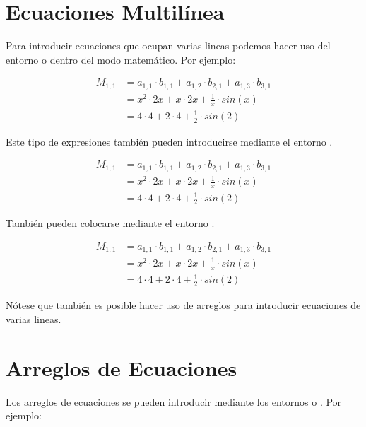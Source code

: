 \documentclass[letterpaper,12pt]{book}
\begin{document}
\pagebreak

\section{Ecuaciones Multilínea}

Para introducir ecuaciones que ocupan varias lineas podemos hacer uso del entorno \verb@aligned@ o 
\verb@split@ dentro del modo matemático. Por ejemplo:

\[
\begin{aligned}
	M_{1,1} &= a_{1,1} \cdot b_{1,1} + a_{1,2} \cdot b_{2,1} + a_{1,3} \cdot b_{3,1} \\
			&= x^2 \cdot 2x + x \cdot 2x + \frac{1}{x} \cdot sin(x) \\
			&= 4 \cdot 4 + 2 \cdot 4 + \frac{1}{2} \cdot sin(2) 
\end{aligned}
\]

Este tipo de expresiones también pueden introducirse mediante el entorno \verb@equation@.

\begin{equation*}
\begin{aligned}
	M_{1,1} &= a_{1,1} \cdot b_{1,1} + a_{1,2} \cdot b_{2,1} + a_{1,3} \cdot b_{3,1} \\
			&= x^2 \cdot 2x + x \cdot 2x + \frac{1}{x} \cdot sin(x) \\
			&= 4 \cdot 4 + 2 \cdot 4 + \frac{1}{2} \cdot sin(2) 
\end{aligned}
\end{equation*}

También pueden colocarse mediante el entorno \verb@align@.

\begin{align*}
	M_{1,1} &= a_{1,1} \cdot b_{1,1} + a_{1,2} \cdot b_{2,1} + a_{1,3} \cdot b_{3,1} \\
			&= x^2 \cdot 2x + x \cdot 2x + \frac{1}{x} \cdot sin(x) \\
			&= 4 \cdot 4 + 2 \cdot 4 + \frac{1}{2} \cdot sin(2) 
\end{align*}

Nótese que también es posible hacer uso de arreglos para introducir ecuaciones de varias lineas.

\newpage

\section{Arreglos de Ecuaciones}

Los arreglos de ecuaciones se pueden introducir mediante los entornos \verb@aligned@ o \verb@align@. Por ejemplo:
\end{document}

